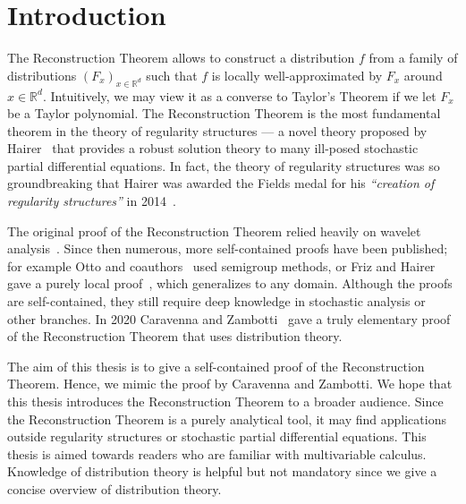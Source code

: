 \chapter{Introduction} 

The Reconstruction Theorem allows to construct a distribution \(f\) from a family of distributions \({(F_{x})}_{x \in \mathbb{R}^d}\) such that \(f\) is locally well-approximated by \(F_x\) around \(x \in \mathbb{R}^d\). Intuitively, we may view it as a converse to Taylor's Theorem if we let \(F_x\) be a Taylor polynomial. The Reconstruction Theorem is the most fundamental theorem in the theory of regularity structures --- a novel theory proposed by Hairer~\cite{hairer2014theory} that provides a robust solution theory to many ill-posed stochastic partial differential equations. In fact, the theory of regularity structures was so groundbreaking that Hairer was awarded the Fields medal for his \emph{``creation of regularity structures''} in 2014~\cite{FieldsMedalHairer}.

The original proof of the Reconstruction Theorem relied heavily on wavelet analysis~\cite{hairer2017reconstruction}. Since then numerous, more self-contained proofs have been published; for example Otto and coauthors~\cite{otto2019quasilinear} used semigroup methods, or Friz and Hairer gave a purely local proof~\cite{friz2020course}, which generalizes to any domain. Although the proofs are self-contained, they still require deep knowledge in stochastic analysis or other branches. In 2020 Caravenna and Zambotti~\cite{caravenna2021hairer} gave a truly elementary proof of the Reconstruction Theorem that uses distribution theory. 

The aim of this thesis is to give a self-contained proof of the Reconstruction Theorem. Hence, we mimic the proof by Caravenna and Zambotti. We hope that this thesis introduces the Reconstruction Theorem to a broader audience. Since the Reconstruction Theorem is a purely analytical tool, it may find applications outside regularity structures or stochastic partial differential equations. This thesis is aimed towards readers who are familiar with multivariable calculus. Knowledge of distribution theory is helpful but not mandatory since we give a concise overview of distribution theory.

